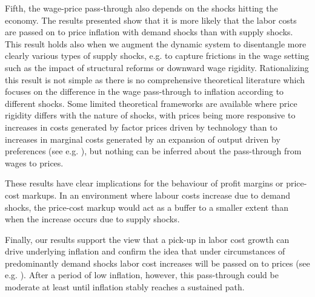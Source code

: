 \documentclass[11pt]{article}
\begin{document}
Fifth, the wage-price pass-through also depends on the shocks hitting the economy. The results presented show that it is more likely that the labor costs are passed on to price inflation with demand shocks than with supply shocks. This result holds also when we augment the dynamic system to disentangle more clearly various types of supply shocks, e.g. to capture frictions in the wage setting such as the impact of structural reforms or downward wage rigidity. Rationalizing this result is not simple as there is no comprehensive theoretical literature which focuses on the difference in the wage pass-through to inflation according to different shocks. Some limited theoretical frameworks are available where price rigidity differs with the nature of shocks, with prices being more responsive to increases in costs generated by factor prices driven by technology than to increases in marginal costs generated by an expansion of output driven by preferences (see e.g. \cite{Bils_Chang_2000}), but nothing can be inferred about the pass-through from wages to prices.

These results have clear implications for the behaviour of profit margins or price-cost markups. In an environment where labour costs increase due to demand shocks, the price-cost markup would act as a buffer to a smaller extent than when the increase occurs due to supply shocks.   

Finally, our results support the view that a pick-up in labor cost growth can drive underlying inflation and confirm the idea that under circumstances of predominantly demand shocks labor cost increases will be passed on to prices (see e.g. \cite{Hahn_Gumiel_18}). After a period of low inflation, however, this pass-through could be moderate at least until inflation stably reaches a sustained path.

\pagebreak
\end{document}

